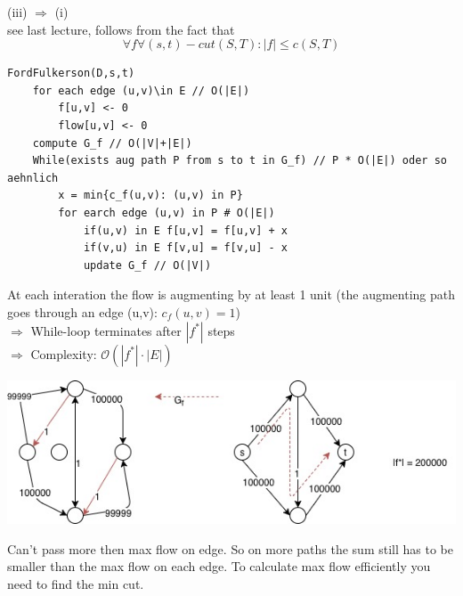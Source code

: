 (iii) $\Rightarrow$ (i) \\
see last lecture, follows from the fact that 
$$\forall f \forall (s,t)-cut (S,T): |f| \leq c(S,T)$$




\begin{verbatim}
FordFulkerson(D,s,t)
    for each edge (u,v)\in E // O(|E|)
        f[u,v] <- 0
        flow[u,v] <- 0
    compute G_f // O(|V|+|E|)
    While(exists aug path P from s to t in G_f) // P * O(|E|) oder so aehnlich
        x = min{c_f(u,v): (u,v) in P}
        for earch edge (u,v) in P # O(|E|)
            if(u,v) in E f[u,v] = f[u,v] + x
            if(v,u) in E f[v,u] = f[v,u] - x
            update G_f // O(|V|)
\end{verbatim}


At each interation the flow is augmenting by at least 1 unit (the augmenting path goes through an edge (u,v): $c_f(u,v)=1$)\\
$\Rightarrow$ While-loop terminates after $|f^*|$ steps \\
$\Rightarrow$ Complexity: $\mathcal{O}(|f^*|\cdot |E|)$ \\



\begin{center}
	\includegraphics[scale=0.5]{img/graph14}
\end{center}

Can't pass more then max flow on edge. So on more paths the sum still has to be smaller than the max flow on each edge. To calculate max flow efficiently you need to find the min cut. 
